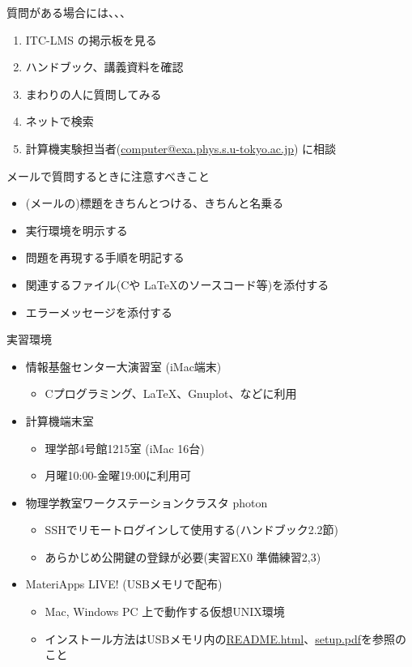 \documentclass[dvipdfmx]{beamer}
\begin{document}
\begin{frame}[t]{質問がある場合には、、、}
  \begin{enumerate}
  \item ITC-LMS の掲示板を見る
  \item ハンドブック、講義資料を確認
  \item まわりの人に質問してみる
  \item ネットで検索
  \item 計算機実験担当者(\href{mailto:computer@exa.phys.s.u-tokyo.ac.jp}{computer@exa.phys.s.u-tokyo.ac.jp}) に相談
  \end{enumerate}
  メールで質問するときに注意すべきこと
  \begin{itemize}
  \item (メールの)標題をきちんとつける、きちんと名乗る
  \item 実行環境を明示する
  \item 問題を再現する手順を明記する
  \item 関連するファイル(Cや \LaTeX のソースコード等)を添付する
  \item エラーメッセージを添付する
  \end{itemize}
\end{frame}

\begin{frame}[t,fragile]{実習環境}
  \begin{itemize}
    \setlength{\itemsep}{1em}
  \item 情報基盤センター大演習室 (iMac端末)
    \begin{itemize}
    \item Cプログラミング、\LaTeX、Gnuplot、などに利用
    \end{itemize}
  \item 計算機端末室
    \begin{itemize}
    \item 理学部4号館1215室 (iMac 16台)
    \item 月曜10:00-金曜19:00に利用可
    \end{itemize}
  \item 物理学教室ワークステーションクラスタ photon
    \begin{itemize}
    \item SSHでリモートログインして使用する(ハンドブック2.2節)
    \item あらかじめ公開鍵の登録が必要(実習EX0 準備練習2,3)
    \end{itemize}
  \item MateriApps LIVE! (USBメモリで配布)
    \begin{itemize}
    \item Mac, Windows PC 上で動作する仮想UNIX環境
  \item インストール方法はUSBメモリ内の\href{https://github.com/cmsi/MateriAppsLive/wiki/MateriAppsLive-ltx}{README.html}、\href{https://github.com/cmsi/MateriAppsLive-setup/blob/master/ova/setup.pdf}{setup.pdf}を参照のこと
    \end{itemize}
  \end{itemize}
\end{frame}
\end{document}
